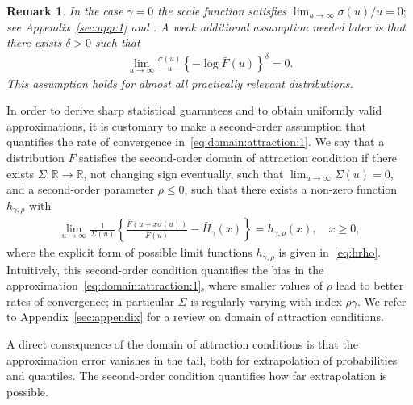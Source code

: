 \documentclass{statsoc}
\newtheorem{remark}{Remark}
\theoremstyle{break}
\newcommand{\beam}{\begin{eqnarray}}
\newcommand{\eeam}{\end{eqnarray}\noindent}
\begin{document}
\begin{remark}\label{rem:sigma_U}
	In the case $\gamma=0$ the scale function satisfies
	$\lim_{u \to \infty} \sigma(u)/u = 0;$
	see Appendix~\ref{sec:app:1} and \citet[Lemma 1.2.9]{dehaan:ferreira:2006}.
	A weak additional assumption needed later is that there exists $\delta > 0$ such that
	\begin{align}\label{ass_aU}
		\lim_{u \to \infty}	\frac{\sigma(u) }{u}
	   \left\{- \log \bar F(u) \right\}^{\delta} = 0.
   \end{align}	
	This assumption holds for almost all practically relevant distributions. 
\end{remark}



In order to derive sharp statistical guarantees and to obtain uniformly valid approximations, it is customary to make a second-order assumption that quantifies the rate of convergence in~\eqref{eq:domain:attraction:1}. 
We say that a distribution $F$ satisfies the second-order domain of attraction condition if there exists $\Sigma : \mathbb{R} \to \mathbb{R}$, not changing sign eventually, such that $\lim_{u \to \infty} \Sigma(u) = 0$, and a second-order parameter $\rho \leq 0$, such that there exists a non-zero function $h_{\gamma,\rho}$ with
\beam \label{eq:second:order:intro}
\lim_{u \to \infty} \frac{1}{\Sigma(u) }\left\{ \frac{ \bar F( u + x\sigma(u)) }{ \bar F (u)} -  \bar H_{\gamma}(x)\right\} = h_{\gamma,\rho}(x), \quad x \geq 0,
\eeam 
where the explicit form of possible limit functions $h_{\gamma,\rho}$ is given in~\eqref{eq:hrho}.
Intuitively, this second-order condition quantifies the bias in the approximation~\eqref{eq:domain:attraction:1}, where  smaller values of $\rho$ lead to better rates of convergence; in particular $\Sigma$ is regularly varying with index $\rho \gamma$.
We refer to Appendix~\ref{sec:appendix} for a review on domain of attraction conditions.


A direct consequence of the domain of attraction conditions is that the approximation error vanishes in the tail, both for extrapolation 
of probabilities and quantiles. The second-order condition quantifies how far extrapolation is possible.
\end{document}
